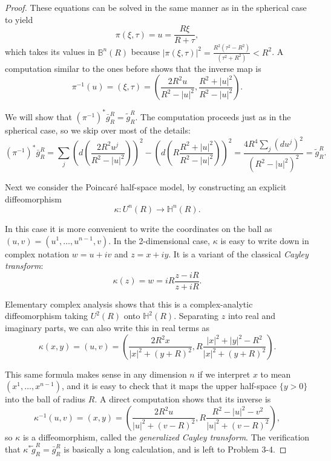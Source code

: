 \begin{proof}
These equations can be solved in the same manner as in the spherical case to yield
\[
\pi(\xi,\tau) = u = \frac{R\xi}{R+\tau},
\]
which takes its values in $\mathbb{B}^n(R)$ because $|\pi(\xi,\tau)|^2 = \frac{R^2(\tau^2-R^2)}{(\tau^2+R^2)} < R^2$. A computation similar to the ones before shows that the inverse map is
\[
\pi^{-1}(u) = (\xi,\tau) = \left(\frac{2R^2u}{R^2-|u|^2}, \frac{R^2+|u|^2}{R^2-|u|^2}\right).
\]

We will show that $(\pi^{-1})^*\bar{g}_R^R = \tilde{g}_R^R$. The computation proceeds just as in the spherical case, so we skip over most of the details:
\[
(\pi^{-1})^*\bar{g}_R^R = \sum_j \left(d\left(\frac{2R^2 u^j}{R^2-|u|^2}\right)\right)^2 - \left(d\left(R\frac{R^2+|u|^2}{R^2-|u|^2}\right)\right)^2
= \frac{4R^4\sum_j(du^j)^2}{(R^2-|u|^2)^2}
= \tilde{g}_R^R.
\]

Next we consider the Poincaré half-space model, by constructing an explicit diffeomorphism
\[
\kappa: U^n(R) \to \mathbb{H}^n(R).
\]

In this case it is more convenient to write the coordinates on the ball as $(u,v) = (u^1, \ldots, u^{n-1}, v)$. In the 2-dimensional case, $\kappa$ is easy to write down in complex notation $w = u + iv$ and $z = x + iy$. It is a variant of the classical \emph{Cayley transform}:
\begin{equation}
\kappa(z) = w = iR\frac{z-iR}{z+iR}. \tag{3.14}
\end{equation}

Elementary complex analysis shows that this is a complex-analytic diffeomorphism taking $U^2(R)$ onto $\mathbb{H}^2(R)$. Separating $z$ into real and imaginary parts, we can also write this in real terms as
\begin{equation}
\kappa(x,y) = (u,v) = \left(\frac{2R^2x}{|x|^2+(y+R)^2}, R\frac{|x|^2+|y|^2-R^2}{|x|^2+(y+R)^2}\right). \tag{3.15}
\end{equation}

This same formula makes sense in any dimension $n$ if we interpret $x$ to mean $(x^1, \ldots, x^{n-1})$, and it is easy to check that it maps the upper half-space $\{y > 0\}$ into the ball of radius $R$. A direct computation shows that its inverse is
\[
\kappa^{-1}(u,v) = (x,y) = \left(\frac{2R^2u}{|u|^2+(v-R)^2}, R\frac{R^2-|u|^2-v^2}{|u|^2+(v-R)^2}\right),
\]
so $\kappa$ is a diffeomorphism, called the \emph{generalized Cayley transform}. The verification that $\kappa^*\tilde{g}_R^R = \bar{g}_R^R$ is basically a long calculation, and is left to Problem 3-4.
\end{proof}

